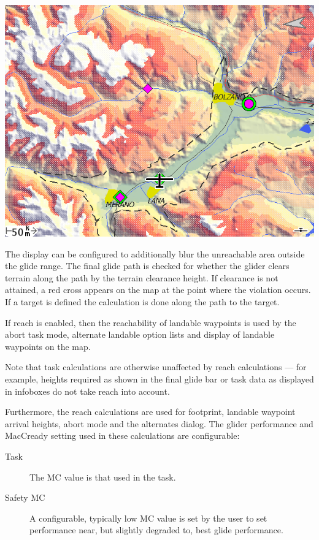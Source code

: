 \begin{description}
\begin{center}
\includegraphics[angle=0,width=1.0\linewidth,keepaspectratio='true']{figures/reach2.png}
\end{center}

\end{description}

The display can be configured to additionally blur the unreachable area
outside the glide range. 
The final glide path is checked for whether the glider clears terrain along
the path by the terrain clearance height.  If clearance is not attained, a red
cross appears on the map at the point where the violation occurs. If a target is
defined the calculation is done along the path to the target. 

If reach is enabled, then the reachability of landable waypoints is used
by the abort task mode, alternate landable option lists and display of
landable waypoints on the map.

Note that task calculations are otherwise unaffected by reach
calculations --- for example, heights required as shown in the final
glide bar or task data as displayed in infoboxes do not take reach into account.

Furthermore, the reach calculations are used for footprint, landable
waypoint arrival heights, abort mode and the alternates dialog.  The glider
performance and MacCready setting used in these calculations are configurable:
\begin{description}
\item[Task] The MC value is that used in the task.
\item[Safety MC] A configurable, typically low MC value is set by the user to set
 performance near, but slightly degraded to, best glide performance.

\end{description}


